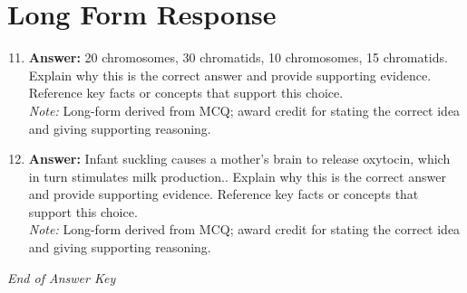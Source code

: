 \documentclass[12pt]{article}
\begin{document}
\section*{Long Form Response}
\begin{enumerate}[label=\arabic*.]
\setcounter{enumi}{10}
\item \textbf{Answer:} 20 chromosomes, 30 chromatids, 10 chromosomes, 15 chromatids. Explain why this is the correct answer and provide supporting evidence. Reference key facts or concepts that support this choice.
\\ \textit{Note:} Long-form derived from MCQ; award credit for stating the correct idea and giving supporting reasoning.
\item \textbf{Answer:} Infant suckling causes a mother's brain to release oxytocin, which in turn stimulates milk production.. Explain why this is the correct answer and provide supporting evidence. Reference key facts or concepts that support this choice.
\\ \textit{Note:} Long-form derived from MCQ; award credit for stating the correct idea and giving supporting reasoning.
\end{enumerate}

\vfill
\noindent\textit{End of Answer Key}
\end{document}
